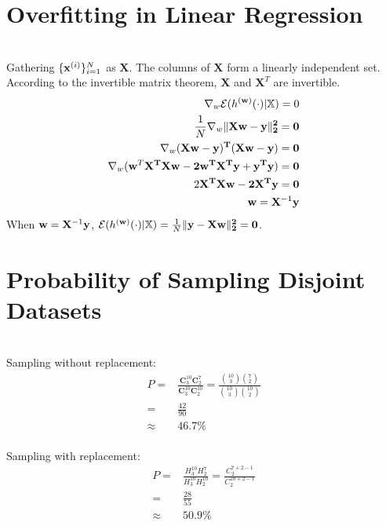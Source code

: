 \documentclass[article,11pt]{article}
\begin{document}
\section{Overfitting in Linear Regression}
 \\
Gathering  $\{ {\bf x}^{(i)} \}_{i=1}^{N}$ as $\mathbf{X}$. The columns of $\mathbf{X}$ form a linearly independent set. According to the invertible matrix theorem, $\mathbf{X}$ and $\mathbf{X}^{T}$ are invertible.
\begin{equation}
\begin{aligned}
\nabla_{w}\mathcal{E}(h^{({\bf w})}(\cdot) | \mathbb{X})=0 \\
\frac{1}{N}\nabla_{w}\lVert \bf{X} {\bf w}-{\bf y} \rVert_{2}^{2}=0 \\
\nabla_{w}(\bf{X}{\bf w}-{\bf y})^{T}(\bf{X}{\bf w}-{\bf y})=0 \\
\nabla_{w}({\bf w}^{T}\bf{X}^{T}\bf{X}{\bf w}-2{\bf w}^{T}\bf{X}^{T}{\bf y}+{\bf y}^{T}{\bf y})=0 \\
2\bf{X}^{T}\bf{X}{\bf w}-2\bf{X}^{T}{\bf y}=0 \\
{\bf w} = \mathbf{X}^{-1}{\bf y}
\end{aligned}
\end{equation}
When ${\bf w} = \mathbf{X}^{-1}{\bf y}$, 
 $\mathcal{E}(h^{({\bf w})}(\cdot) | \mathbb{X})=\frac{1}{N}\lVert {\bf y}-\bf{X} {\bf w} \rVert_{2}^{2}=0$.
\newpage

\section{Probability of Sampling Disjoint Datasets}
\\
Sampling without replacement:
\begin{equation}
\begin{aligned}
	P = & 
\frac{\mathbf{C}_{3}^{10}\mathbf{C}_{2}^{7}}{\mathbf{C}_{3}^{10}\mathbf{C}_{2}^{10}} = 
\frac{\binom{10}{3}\binom{7}{2}}{\binom{10}{3}\binom{10}{2}}\\
= &
\frac{42}{90} \\
\approx &
46.7 \%
\end{aligned}
\end{equation}\\
Sampling with replacement:
\begin{equation}
\begin{aligned}
P = &\frac{H_{3}^{10}H_{2}^{7}}{H_{3}^{10}H_{2}^{10}}
= \frac{C^{7+2-1}_{2}}{C_{2}^{10+2-1}} \\
= & \frac{28}{55} \\
\approx & 50.9 \%
\end{aligned}
\end{equation}
\end{document}
